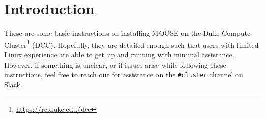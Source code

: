 \documentclass[class=Report, crop=false]{standalone}
\begin{document}
\section{Introduction}

These are some basic instructions on installing MOOSE on the Duke Compute Cluster\footnote{\url{https://rc.duke.edu/dcc}} (DCC). Hopefully, they are detailed enough such that users with limited Linux experience are able to get up and running with minimal assistance. However, if something is unclear, or if issues arise while following these instructions, feel free to reach out for assistance on the \texttt{#cluster} channel on Slack.
\end{document}

